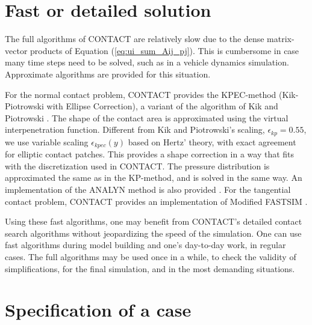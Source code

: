 \documentclass[12pt]{report}
\begin{document}
\section{Fast or detailed solution}
\label{sec:fast_detailed}

The full algorithms of CONTACT are relatively slow due to the dense
matrix-vector products of Equation (\ref{eq:ui_sum_Aij_pj}). This is
cumbersome in case many time steps need to be solved, such as in a
vehicle dynamics simulation. Approximate algorithms are provided for
this situation.

For the normal contact problem, CONTACT provides the KPEC-method
(Kik-Piotrowski with Ellipse Correction),
a variant of the algorithm of Kik and Piotrowski \cite{Kik1996,
Piotrowski2008}. The shape of the contact area is approximated using the
virtual interpenetration function. Different from Kik and Piotrowski's scaling,
$\epsilon_{kp}=0.55$, we use variable scaling $\epsilon_{kpec}(y)$ based
on Hertz' theory, with exact agreement for elliptic contact patches. This
provides a shape correction in a way that fits with the discretization
used in CONTACT. The pressure distribution is approximated the same as in
the KP-method, and is solved in the same way. 
An implementation of the ANALYN method is also provided \cite{Sichani2014b}.
For the tangential contact problem, CONTACT provides an implementation of
Modified FASTSIM \cite{Spiryagin2013}.

Using these fast algorithms, one may benefit from CONTACT's detailed
contact search algorithms without jeopardizing the speed of the simulation.
One can use fast algorithms during model building and one's day-to-day
work, in regular cases. The full algorithms may be used once in a while,
to check the validity of simplifications, for the final simulation, and in
the most demanding situations.

\section{Specification of a case}
\end{document}
